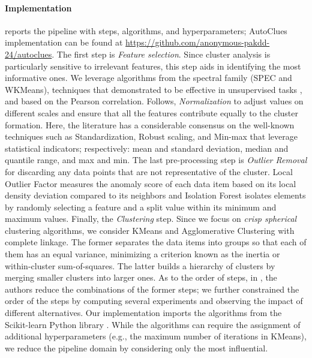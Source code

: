 \paragraph{Implementation}  reports the pipeline with steps, algorithms, and hyperparameters; AutoClues implementation can be found at \url{https://github.com/anonymous-pakdd-24/autoclues}.
The first step is \textit{Feature selection}.
Since cluster analysis is particularly sensitive to irrelevant features, this step aids in identifying the most informative ones.
We leverage algorithms from the spectral family (SPEC and WKMeans), techniques that demonstrated to be effective in unsupervised tasks \cite{alelyani2018feature}, and based on the Pearson correlation.
Follows, \textit{Normalization} to adjust values on different scales and ensure that all the features contribute equally to the cluster formation.
Here, the literature has a considerable consensus on the well-known techniques such as Standardization, Robust scaling, and Min-max that leverage statistical indicators; respectively: mean and standard deviation, median and quantile range, and max and min.
The last pre-processing step is \textit{Outlier Removal} for discarding any data points that are not representative of the cluster.
Local Outlier Factor \cite{breunig2000lof} measures the anomaly score of each data item based on its local density deviation compared to its neighbors and Isolation Forest \cite{liu2012isolation} isolates elements by randomly selecting a feature and a split value within its minimum and maximum values.
Finally, the \textit{Clustering} step.
Since we focus on \textit{crisp spherical} clustering algorithms, we consider KMeans \cite{arthur2006k} and Agglomerative Clustering \cite{murtagh2017algorithms} with complete linkage.
The former separates the data items into groups so that each of them has an equal variance, minimizing a criterion known as the inertia or within-cluster sum-of-squares.
The latter builds a hierarchy of clusters by merging smaller clusters into larger ones.
As to the order of steps, in \cite{giovanelli2022data}, the authors reduce the combinations of the former steps; we further constrained the order of the steps by computing several experiments and observing the impact of different alternatives.
Our implementation imports the algorithms from the Scikit-learn Python library \cite{scikit-learn}.
While the algorithms can require the assignment of additional hyperparameters (e.g., the maximum number of iterations in KMeans), we reduce the pipeline domain by considering only the most influential.

